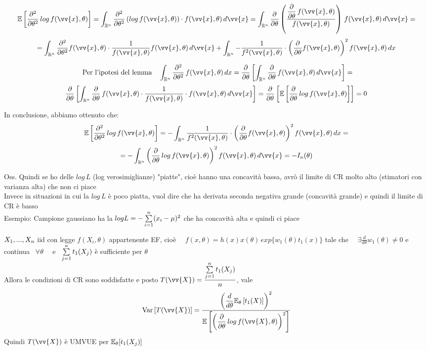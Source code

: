 \begin{Dim}[Lemma2]
    \phantom{}\vspace*{-15pt}
    \[\E{\frac{\partial^2}{\partial\theta^2}\, log\, f(\vv{x},\theta)} = \int_{\R^n} \frac{\partial^2}{\partial\theta^2}\O log\, f(\vv{x},\theta)\C \cdot f(\vv{x},\theta)\, d\vv{x} = \int_{\R^n} \frac{\partial }{\partial \theta} \O \frac{ \frac{\partial }{\partial \theta} \, f(\vv{x},\theta)  }{f(\vv{x},\theta)}\C\, f(\vv{x},\theta) \, d\vv{x}=\] 
    \[= \int_{\R^n} \frac{\partial^2 }{\partial \theta^2} f(\vv{x},\theta)\cdot \frac{1}{f(\vv{x},\theta)} f(\vv{x},\theta)\, d\vv{x} + \int_{\R^n} - \frac{1}{f^2(\vv{x},\theta)}\cdot \O \frac{\partial }{\partial \theta} f(\vv{x},\theta)  \C^2 f(\vv{x},\theta) \, dx
    \]
    
    \[
    \text{ Per l'ipotesi del lemma } \ \ 
     \int_{\R^n} \frac{\partial^2}{\partial\theta^2}\, f(\vv{x},\theta)\, dx = \frac{\partial }{\partial \theta} \OO \int_{\R^n} \frac{\partial }{\partial \theta} \, f(\vv{x}, \theta) \, d\vv{x}  \CC = \]\[\frac{\partial }{\partial \theta} \OO \int_{\R^n} \frac{\partial }{\partial \theta} \, f(\vv{x}, \theta) \cdot \frac{1}{f(\vv{x}, \theta)} \cdot f(\vv{x}, \theta) \, d\vv{x}  \CC = \frac{\partial }{\partial \theta} \OO \E{ \frac{\partial }{\partial \theta}\, log \, f(\vv{x}, \theta)  } \CC =0
    \]
    \phantom{}
    
    In conclusione, abbiamo ottenuto che:
    \[
    \E{\frac{\partial^2}{\partial\theta^2}\, log\, f(\vv{x},\theta)} = - \int_{\R^n} \frac{1}{f^2(\vv{x},\theta)}\cdot \O \frac{\partial }{\partial \theta} f(\vv{x},\theta)  \C^2 f(\vv{x},\theta) \, dx =\]\[ = - \int_{\R^n} \O \frac{\partial }{\partial \theta} \, log\, f(\vv{x},\theta) \C^2 f(\vv{x},\theta) \, d\vv{x} = - I_n(\theta)
    \]
\end{Dim}


Oss. Quindi se ho delle $log \,L$ (log verosimiglianze) "piatte", cioè hanno una concavità bassa, avrò il limite di CR molto alto (stimatori con varianza alta) che non ci piace\\
Invece in situazioni in cui la $log\, L$ è poco piatta, vuol dire che ha derivata seconda negativa grande (concavità grande) e quindi il limite di CR è basso \\

Esempio: Campione gaussiano ha la $log L = -\sum\limits_{i=1}^{n} (x_i-\mu)^2$ che ha concavità alta e quindi ci piace\\


\begin{teo}
    $X_1,...,X_n$ iid con legge $f(X_i,\theta)$ appartenente EF, cioè \ \ $f(x,\theta) = h(x) x(\theta) \, exp \{w_1(\theta) t_1(x)\}$ tale che \ \ $\exists \frac{d}{d\theta} w_1(\theta)\ne 0 $ e continua \ $\forall \theta$ \ \ e \ $\sum\limits_{j=1}^{n} t_1(X_j)$ è sufficiente per $\theta$\\
    Allora le condizioni di CR sono soddisfatte e posto $T(\vv{X})=\frac{\Sum{j=1}{n} t_1(X_j)}{n}$, vale \[\var{T(\vv{X})} = \frac{ \O \frac{d}{d\theta} \EE_{\theta}\OO t_1(X)\CC \C^2 }{\E{\O \frac{\partial }{\partial \theta} \, log\, f(\vv{X},\theta)  \C^2 }} \]
    Quindi $T(\vv{X})$ è UMVUE per $\mathbb E_{\theta} [t_1 (X_j)]$
\end{teo}

